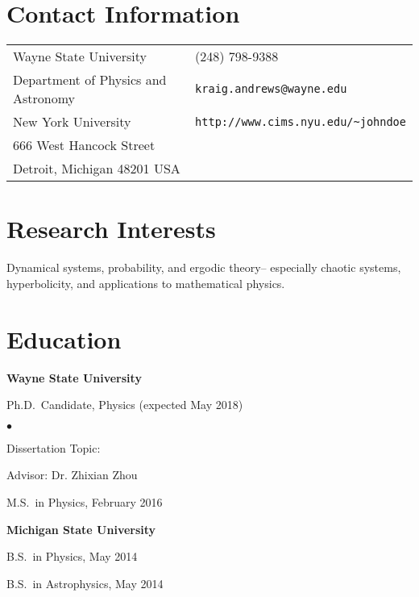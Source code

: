 \documentclass[margin,line,pifont,palatino,courier]{cv_short_current}
\newenvironment{list1}{
  \begin{list}{\ding{113}}{%
      \setlength{\itemsep}{0in}
      \setlength{\parsep}{0in} \setlength{\parskip}{0in}
      \setlength{\topsep}{0in} \setlength{\partopsep}{0in}
      \setlength{\leftmargin}{0.17in}}}{\end{list}}
\newenvironment{list2}{
  \begin{list}{$\bullet$}{%
      \setlength{\itemsep}{0in}
      \setlength{\parsep}{0in} \setlength{\parskip}{0in}
      \setlength{\topsep}{0in} \setlength{\partopsep}{0in}
      \setlength{\leftmargin}{0.2in}}}{\end{list}}
\begin{document}

\begin{resume}

\section{\sc Contact Information}

\vspace{.05in}
\begin{tabular}{@{}p{2.75in}p{2in}}
Wayne State University & (248) 798-9388 \\
Department of Physics and Astronomy                        & \verb+kraig.andrews@wayne.edu+\\
New York University                  & \verb+http://www.cims.nyu.edu/~johndoe+\\
666 West Hancock Street               & \\
Detroit, Michigan 48201 USA               & \\
\end{tabular}

\section{\sc Research Interests}
Dynamical systems, probability, and ergodic theory-- especially
chaotic systems, hyperbolicity, and applications to mathematical
physics.

\section{\sc Education}

{\bf Wayne State University}\\
\vspace*{-.1in}
\begin{list1}
\item[] Ph.D.~Candidate, Physics (expected May 2018)

\begin{list2}
\vspace*{.05in}
\item Dissertation Topic:  
\item Advisor: Dr. Zhixian Zhou
\end{list2}
\item[] M.S.~in Physics, February 2016
\end{list1}

{\bf Michigan State University}\\
\vspace*{-.1in}
\begin{list1}
\item[] B.S.~in Physics, May 2014
\item[] B.S.~in Astrophysics, May 2014


\end{list1}
\end{resume}
\end{document}
